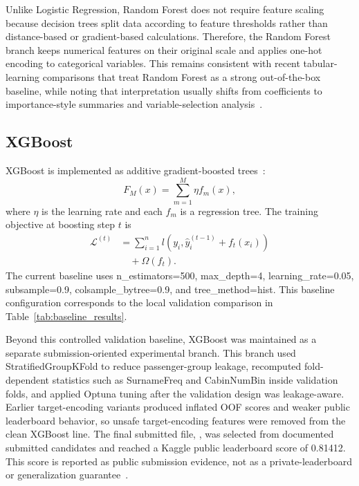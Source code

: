 \documentclass[conference]{IEEEtran}
\renewcommand{\texttt}[1]{\textnormal{#1}}
\begin{document}
Unlike Logistic Regression, Random Forest does not require feature scaling because decision trees split data according to feature thresholds rather than distance-based or gradient-based calculations. Therefore, the Random Forest branch keeps numerical features on their original scale and applies one-hot encoding to categorical variables. This remains consistent with recent tabular-learning comparisons that treat Random Forest as a strong out-of-the-box baseline, while noting that interpretation usually shifts from coefficients to importance-style summaries and variable-selection analysis~\cite{grinsztajn2022trees,rothacher2024rfvarselect}.

\subsection{XGBoost}
XGBoost is implemented as additive gradient-boosted trees~\cite{xgboost}:
\begin{equation}
F_M(x) = \sum_{m=1}^{M} \eta f_m(x),
\end{equation}
where $\eta$ is the learning rate and each $f_m$ is a regression tree. The training objective at boosting step $t$ is
\begin{equation}
\begin{aligned}
\mathcal{L}^{(t)}
    &= \sum_{i=1}^{n} l\left(y_i, \hat{y}_i^{(t-1)} + f_t(x_i)\right) \\
    &\quad + \Omega(f_t).
\end{aligned}
\end{equation}
The current baseline uses \texttt{n\_estimators=500}, \texttt{max\_depth=4}, \texttt{learning\_rate=0.05}, \texttt{subsample=0.9}, \texttt{colsample\_bytree=0.9}, and \texttt{tree\_method=hist}. This baseline configuration corresponds to the local validation comparison in Table~\ref{tab:baseline_results}.

Beyond this controlled validation baseline, XGBoost was maintained as a separate submission-oriented experimental branch. This branch used \texttt{StratifiedGroupKFold} to reduce passenger-group leakage, recomputed fold-dependent statistics such as \texttt{SurnameFreq} and \texttt{CabinNumBin} inside validation folds, and applied Optuna tuning after the validation design was leakage-aware. Earlier target-encoding variants produced inflated OOF scores and weaker public leaderboard behavior, so unsafe target-encoding features were removed from the clean XGBoost line. The final submitted file, , was selected from documented submitted candidates and reached a Kaggle public leaderboard score of 0.81412. This score is reported as public submission evidence, not as a private-leaderboard or generalization guarantee~\cite{kapoor2024reforms}.
\end{document}
